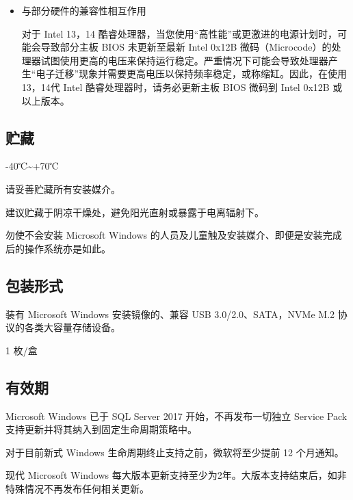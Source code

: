 \documentclass{article}
\begin{document}
\begin{multicols*}{3}
\begin{itemize}[leftmargin=*]
		\item 与部分硬件的兼容性相互作用
		
		对于 Intel 13，14 酷睿处理器，当您使用“高性能”或更激进的电源计划时，可能会导致部分主板 BIOS 未更新至最新 Intel  0x12B 微码（Microcode）的处理器试图使用更高的电压来保持运行稳定。严重情况下可能会导致处理器产生“电子迁移”现象并需要更高电压以保持频率稳定，或称缩缸。因此，在使用13，14代 Intel 酷睿处理器时，请务必更新主板 BIOS 微码到 Intel 0x12B 或以上版本。

	\end{itemize}


	\begin{tcolorbox}
	\section*{贮藏}
	\end{tcolorbox}

	-40℃\textasciitilde +70℃

	请妥善贮藏所有安装媒介。
	
	建议贮藏于阴凉干燥处，避免阳光直射或暴露于电离辐射下。
	
	勿使不会安装 Microsoft Windows 的人员及儿童触及安装媒介、即便是安装完成后的操作系统亦是如此。

	\medskip


	\begin{tcolorbox}
	\section*{包装形式}
	\end{tcolorbox}

	装有 Microsoft Windows 安装镜像的、兼容 USB 3.0/2.0、SATA，NVMe M.2 协议的各类大容量存储设备。

	1 枚/盒

	\medskip


	\begin{tcolorbox}
	\section*{有效期}
	\end{tcolorbox}

	Microsoft Windows 已于 SQL Server 2017 开始，不再发布一切独立 Service Pack 支持更新并将其纳入到固定生命周期策略中。

	对于目前新式 Windows 生命周期终止支持之前，微软将至少提前 12 个月通知。
	
	现代 Microsoft Windows 每大版本更新支持至少为2年。大版本支持结束后，如非特殊情况不再发布任何相关更新。


\end{multicols*}
\end{document}
